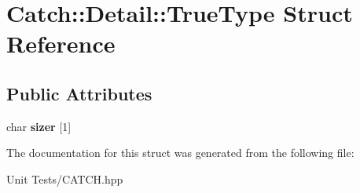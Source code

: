\hypertarget{structCatch_1_1Detail_1_1TrueType}{}\section{Catch\+:\+:Detail\+:\+:True\+Type Struct Reference}
\label{structCatch_1_1Detail_1_1TrueType}
\subsection*{Public Attributes}
\begin{DoxyCompactItemize}
\item 
char {\bfseries sizer} \mbox{[}1\mbox{]}\hypertarget{structCatch_1_1Detail_1_1TrueType_a3aaaeb75909e668b293c8a81f5fb6419}{}\label{structCatch_1_1Detail_1_1TrueType_a3aaaeb75909e668b293c8a81f5fb6419}

\end{DoxyCompactItemize}


The documentation for this struct was generated from the following file\+:\begin{DoxyCompactItemize}
\item 
Unit Tests/C\+A\+T\+C\+H.\+hpp\end{DoxyCompactItemize}
